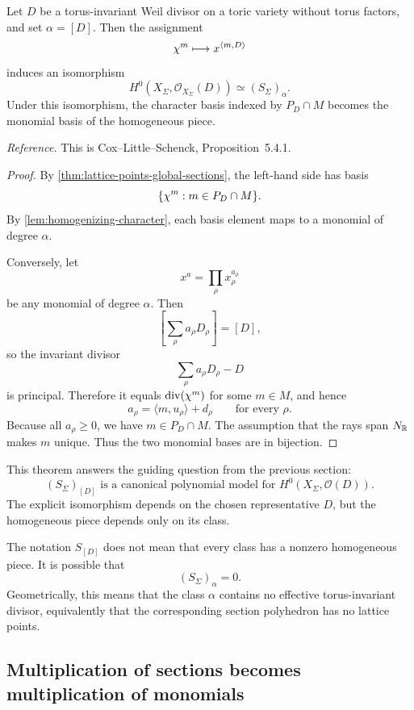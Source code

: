 \begin{theorem}
\label{thm:cox-piece-global-sections}
Let \(D\) be a torus-invariant Weil divisor on a toric variety without
torus factors, and set \(\alpha=[D]\). Then the assignment
\[
\chi^{m}
\longmapsto
x^{\langle m,D\rangle}
\]
induces an isomorphism
\[
\boxed{
H^0(X_\Sigma,\mathcal O_{X_\Sigma}(D))
\simeq
(S_\Sigma)_\alpha.
}
\]
Under this isomorphism, the character basis indexed by
\(P_D\cap M\) becomes the monomial basis of the homogeneous piece.
\end{theorem}

\noindent
\textit{Reference.}
This is Cox--Little--Schenck, Proposition~5.4.1.

\begin{proof}
By \cref{thm:lattice-points-global-sections}, the left-hand side has
basis
\[
\{\chi^{m}:m\in P_D\cap M\}.
\]
By \cref{lem:homogenizing-character}, each basis element maps to a
monomial of degree \(\alpha\).

Conversely, let
\[
x^a=\prod_\rho x_\rho^{a_\rho}
\]
be any monomial of degree \(\alpha\). Then
\[
\left[\sum_\rho a_\rho D_\rho\right]=[D],
\]
so the invariant divisor
\[
\sum_\rho a_\rho D_\rho-D
\]
is principal. Therefore it equals \(\operatorname{div}(\chi^{m})\) for some \(m\in M\),
and hence
\[
a_\rho=\langle m,u_\rho\rangle+d_\rho
\qquad
\text{for every }\rho.
\]
Because all \(a_\rho\geq0\), we have \(m\in P_D\cap M\). The
assumption that the rays span \(N_{\mathbb{R}}\) makes \(m\) unique. Thus the
two monomial bases are in bijection.
\end{proof}

This theorem answers the guiding question from the previous section:
\[
\boxed{
(S_\Sigma)_{[D]}
\text{ is a canonical polynomial model for }
H^0(X_\Sigma,\mathcal O(D)).
}
\]
The explicit isomorphism depends on the chosen representative \(D\),
but the homogeneous piece depends only on its class.

\begin{warningbox}
The notation \(S_{[D]}\) does not mean that every class has a
nonzero homogeneous piece. It is possible that
\[
(S_\Sigma)_\alpha=0.
\]
Geometrically, this means that the class \(\alpha\) contains no
effective torus-invariant divisor, equivalently that the corresponding
section polyhedron has no lattice points.
\end{warningbox}

\subsection{Multiplication of sections becomes multiplication of monomials}

